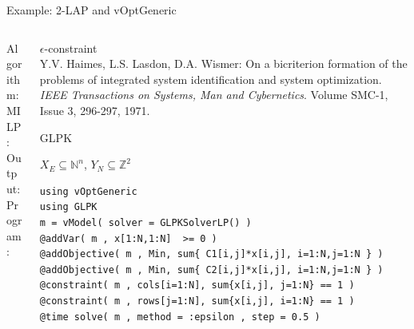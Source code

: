 \documentclass[10pt,xcolor=dvipsnames]{beamer}
\newcommand{\mN}{\mathbb{N}}
\newcommand{\Z}{\mathbb{Z}}
\begin{document}
\begin{frame}[fragile=singleslide]{Example: 2-LAP and vOptGeneric}

\vspace{5mm}
\begin{columns}
%
\begin{column}{0.2\textwidth}
Algorithm: \\
\vspace{18mm}
MILP:\\  
\vspace{2mm}
Output: \\
\vspace{6mm}
Program:
\vspace{30mm}
\end{column}
\begin{column}{0.8\textwidth}
         $\epsilon$-constraint \vspace{1mm}\\
         {\footnotesize Y.V. Haimes, L.S. Lasdon, D.A. Wismer: On a bicriterion formation of the problems of integrated system identification and system optimization. 
         \textit{IEEE Transactions on Systems, Man and Cybernetics}. Volume SMC-1, Issue 3, 296-297, 1971.\\}
\medskip

         GLPK
\medskip

$X_E \subseteq \mN^n$, $Y_N \subseteq \Z^2$
\vspace{3mm}

{\footnotesize
\begin{verbatim}
using vOptGeneric
using GLPK
m = vModel( solver = GLPKSolverLP() )
@addVar( m , x[1:N,1:N]  >= 0 )
@addObjective( m , Min, sum{ C1[i,j]*x[i,j], i=1:N,j=1:N } )
@addObjective( m , Min, sum{ C2[i,j]*x[i,j], i=1:N,j=1:N } )
@constraint( m , cols[i=1:N], sum{x[i,j], j=1:N} == 1 )
@constraint( m , rows[j=1:N], sum{x[i,j], i=1:N} == 1 )
@time solve( m , method = :epsilon , step = 0.5 )
\end{verbatim}
}
          
\end{column}
%
\end{columns}         

       
\end{frame}
\end{document}
